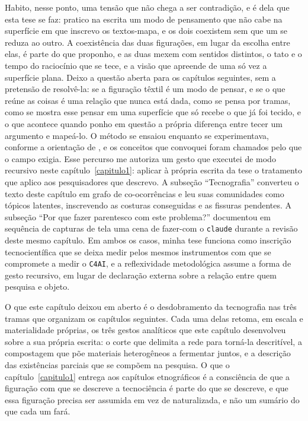 Habito, nesse ponto, uma tensão que não chega a ser contradição, e é dela que esta tese se faz: pratico na escrita um modo de pensamento que não cabe na superfície em que inscrevo os textos-mapa, e os dois coexistem sem que um se reduza ao outro. A coexistência das duas figurações, em lugar da escolha entre elas, é parte do que proponho, e as duas mexem com sentidos distintos, o tato e o tempo do raciocínio que se tece, e a visão que apreende de uma só vez a superfície plana. Deixo a questão aberta para os capítulos seguintes, sem a pretensão de resolvê-la: se a figuração têxtil é um modo de pensar, e se o que reúne as coisas é uma relação que nunca está dada, como se pensa por tramas, como se mostra esse pensar em uma superfície que só recebe o que já foi tecido, e o que acontece quando ponho em questão a própria diferença entre tecer um argumento e mapeá-lo.
O método se ensaiou enquanto se experimentava, conforme a orientação de \textcite{Kofes2015Maconaria}, e os conceitos que convoquei foram chamados pelo que o campo exigia. Esse percurso me autoriza um gesto que executei de modo recursivo neste capítulo~\ref{capitulo1}: aplicar à própria escrita da tese o tratamento que aplico aos pesquisadores que descrevo. A subseção \enquote{Tecnografia} converteu o texto deste capítulo em grafo de co-ocorrências e leu suas comunidades como tópicos latentes, inscrevendo as costuras conseguidas e as fissuras pendentes. A subseção \enquote{Por que fazer parentesco com este problema?} documentou em sequência de capturas de tela uma cena de fazer-com o \texttt{claude} durante a revisão deste mesmo capítulo. Em ambos os casos, minha tese funciona como inscrição tecnocientífica que se deixa medir pelos mesmos instrumentos com que se compromete a medir o \texttt{C4AI}, e a reflexividade metodológica assume a forma de gesto recursivo, em lugar de declaração externa sobre a relação entre quem pesquisa e objeto.

O que este capítulo deixou em aberto é o desdobramento da tecnografia nas três tramas que organizam os capítulos seguintes. Cada uma delas retoma, em escala e materialidade próprias, os três gestos analíticos que este capítulo desenvolveu sobre a sua própria escrita: o corte que delimita a rede para torná-la descritível, a compostagem que põe materiais heterogêneos a fermentar juntos, e a descrição das existências parciais que se compõem na pesquisa. O que o capítulo~\ref{capitulo1} entrega aos capítulos etnográficos é a consciência de que a figuração com que se descreve a tecnociência é parte do que se descreve, e que essa figuração precisa ser assumida em vez de naturalizada, e não um sumário do que cada um fará.


